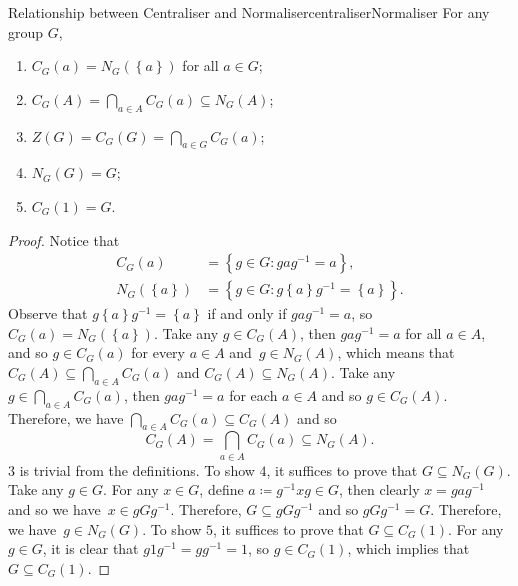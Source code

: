 \documentclass[math]{amznotes}
\theoremstyle{remark}
\newcommand{\0}{\mathbf{0}}
\newcommand{\1}{\mathbf{1}}
\begin{document}
\begin{probox}{Relationship between Centraliser and Normaliser}{centraliserNormaliser}
    For any group $G$, 
    \begin{enumerate}
        \item $C_G\left(a\right) = N_G\left(\left\{a\right\}\right)$ for all $a \in G$;
        \item $C_G\left(A\right) = \bigcap_{a \in A}C_G\left(a\right) \subseteq N_G\left(A\right)$;
        \item $Z\left(G\right) = C_G\left(G\right) = \bigcap_{a \in G}C_G\left(a\right)$;
        \item $N_G\left(G\right) = G$;
        \item $C_G\left(1\right) = G$.
    \end{enumerate}
    \tcblower
    \begin{proof}
        Notice that 
        \begin{align*}
            C_G\left(a\right) & = \left\{g \in G \colon gag^{-1} = a\right\}, \\
            N_G\left(\left\{a\right\}\right) & = \left\{g \in G \colon g\left\{a\right\}g^{-1} = \left\{a\right\}\right\}.
        \end{align*}
        Observe that $g\left\{a\right\}g^{-1} = \left\{a\right\}$ if and only if $gag^{-1} = a$, so $C_G\left(a\right) = N_G\left(\left\{a\right\}\right)$. Take any $g \in C_G\left(A\right)$, then $gag^{-1} = a$ for all $a \in A$, and so $g \in C_G\left(a\right)$ for every $a \in A$ and~$g \in N_G\left(A\right)$, which means that $C_G\left(A\right) \subseteq \bigcap_{a \in A}C_G\left(a\right)$ and $C_G\left(A\right) \subseteq N_G\left(A\right)$. Take any $g \in \bigcap_{a \in A}C_G\left(a\right)$, then $gag^{-1} = a$ for each $a \in A$ and so $g \in C_G\left(A\right)$. Therefore, we have $\bigcap_{a \in A}C_G\left(a\right) \subseteq C_G\left(A\right)$ and so 
        \begin{equation*}
            C_G\left(A\right) = \bigcap_{a \in A}C_G\left(a\right) \subseteq N_G\left(A\right).
        \end{equation*}
        $3$ is trivial from the definitions. To show $4$, it suffices to prove that $G \subseteq N_G\left(G\right)$. Take any $g \in G$. For any $x \in G$, define $a \coloneqq g^{-1}xg \in G$, then clearly $x = gag^{-1}$ and so we have~$x \in gGg^{-1}$. Therefore, $G \subseteq gGg^{-1}$ and so $gGg^{-1} = G$. Therefore, we have~$g \in N_G\left(G\right)$. To show $5$, it suffices to prove that $G \subseteq C_G\left(1\right)$. For any $g \in G$, it is clear that $g1g^{-1} = gg^{-1} = 1$, so $g \in C_G\left(1\right)$, which implies that $G \subseteq C_G\left(1\right)$.
    \end{proof}
\end{probox}
\end{document}

